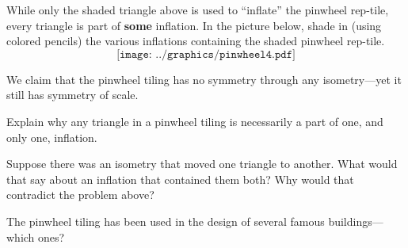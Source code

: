 \begin{prob}
While only the shaded triangle above is used to ``inflate'' the
pinwheel rep-tile, every triangle is part of \textbf{some}
inflation. In the picture below, shade in (using colored pencils) the
various inflations containing the shaded pinwheel rep-tile.
\[
\texttt{[image: ../graphics/pinwheel4.pdf]}
\]
\end{prob}


\break

We claim that the pinwheel tiling has no symmetry through any
isometry---yet it still has symmetry of scale.


\begin{prob}
Explain why any triangle in a pinwheel tiling is necessarily a part of
one, and only one, inflation.
\end{prob}


\begin{prob}
Suppose there was an isometry that moved one triangle to another. What
would that say about an inflation that contained them both? Why would
that contradict the problem above?
\end{prob}


\begin{prob}
The pinwheel tiling has been used in the design of several famous
buildings---which ones?
\end{prob}
